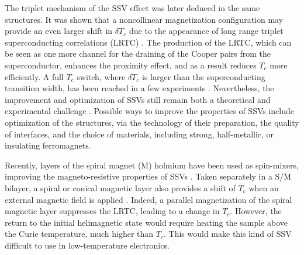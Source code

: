\documentclass[prb,amsmath,amssymb,reprint]{revtex4-2}
\begin{document}
The triplet mechanism of the SSV effect was later deduced  in the same structures. It was shown that a noncollinear magnetization configuration may provide an even larger shift in  $\delta T_{c}$
\cite{Flokstra2015,Aarts2015,Garifullin2013,Blamire2014} due to the appearance of long range triplet superconducting correlations (LRTC) \cite%
{BVE:PRB2001,Shekhter,Eschrig03,VolkovRevModPhys}. The production of the LRTC, which can be seen as  one more channel for the draining of the Cooper pairs from the superconductor, enhances the proximity effect, and as a result reduces $T_{c}$ more efficiently. A full $T_{c}$ switch, where $\delta T_{c}$ is larger than the superconducting transition width, has been reached in  a few experiments \cite{Leksin2010,Leksin2012,Li2013,Gu2015}. Nevertheless, the improvement and
optimization of SSVs still remain both a theoretical and experimental challenge
\cite{Garifullin2018,Brazil2017,Lenk2017,Baker2018,Valls2018,Robinson2018,Kupriyanov2018}%
. Possible ways to improve the properties of SSVs include optimization of the structures, via the technology of their  preparation, the quality of interfaces, and the choice of materials, including strong, half-metallic, or insulating ferromagnets.

Recently, layers of the spiral magnet (M) holmium have been used as spin-mixers, improving the magneto-resistive properties of SSVs \cite{Sosnin2006,Zhu2013,Blamire2014b,Blamire2015,Aarts2015,Chiodi2013,DiBernardo2015}%
. Taken separately in a S/M bilayer, a spiral or conical magnetic layer also
provides a shift of $T_{c}$  when an external magnetic field is applied \cite{DiBernardo2015,Satchell2017}. Indeed, a parallel magnetization of the spiral magnetic layer suppresses the LRTC, leading to a change in $T_{c}$. However, the return to the initial helimagnetic state would require heating the sample above the Curie temperature,  much higher than $T_{c}$. This would make this kind of SSV difficult to use in low-temperature electronics.
\end{document}

